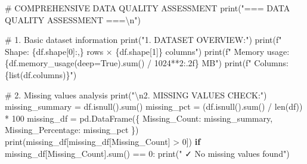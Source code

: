 \documentclass[
  letterpaper,
  DIV=11,
  numbers=noendperiod]{scrartcl}
\newenvironment{Shaded}{\begin{snugshade}}{\end{snugshade}}
\newcommand{\BuiltInTok}[1]{\textcolor[rgb]{0.00,0.23,0.31}{#1}}
\newcommand{\CharTok}[1]{\textcolor[rgb]{0.13,0.47,0.30}{#1}}
\newcommand{\CommentTok}[1]{\textcolor[rgb]{0.37,0.37,0.37}{#1}}
\newcommand{\ControlFlowTok}[1]{\textcolor[rgb]{0.00,0.23,0.31}{\textbf{#1}}}
\newcommand{\DecValTok}[1]{\textcolor[rgb]{0.68,0.00,0.00}{#1}}
\newcommand{\NormalTok}[1]{\textcolor[rgb]{0.00,0.23,0.31}{#1}}
\newcommand{\OperatorTok}[1]{\textcolor[rgb]{0.37,0.37,0.37}{#1}}
\newcommand{\SpecialCharTok}[1]{\textcolor[rgb]{0.37,0.37,0.37}{#1}}
\newcommand{\SpecialStringTok}[1]{\textcolor[rgb]{0.13,0.47,0.30}{#1}}
\newcommand{\StringTok}[1]{\textcolor[rgb]{0.13,0.47,0.30}{#1}}
\newcommand{\VariableTok}[1]{\textcolor[rgb]{0.07,0.07,0.07}{#1}}
\begin{document}
\begin{Shaded}
\begin{Highlighting}[]
\CommentTok{\# COMPREHENSIVE DATA QUALITY ASSESSMENT}
\BuiltInTok{print}\NormalTok{(}\StringTok{"=== DATA QUALITY ASSESSMENT ===}\CharTok{\textbackslash{}n}\StringTok{"}\NormalTok{)}

\CommentTok{\# 1. Basic dataset information}
\BuiltInTok{print}\NormalTok{(}\StringTok{"1. DATASET OVERVIEW:"}\NormalTok{)}
\BuiltInTok{print}\NormalTok{(}\SpecialStringTok{f"   Shape: }\SpecialCharTok{\{}\NormalTok{df}\SpecialCharTok{.}\NormalTok{shape[}\DecValTok{0}\NormalTok{]}\SpecialCharTok{:,\}}\SpecialStringTok{ rows × }\SpecialCharTok{\{}\NormalTok{df}\SpecialCharTok{.}\NormalTok{shape[}\DecValTok{1}\NormalTok{]}\SpecialCharTok{\}}\SpecialStringTok{ columns"}\NormalTok{)}
\BuiltInTok{print}\NormalTok{(}\SpecialStringTok{f"   Memory usage: }\SpecialCharTok{\{}\NormalTok{df}\SpecialCharTok{.}\NormalTok{memory\_usage(deep}\OperatorTok{=}\VariableTok{True}\NormalTok{)}\SpecialCharTok{.}\BuiltInTok{sum}\NormalTok{() }\OperatorTok{/} \DecValTok{1024}\OperatorTok{**}\DecValTok{2}\SpecialCharTok{:.2f\}}\SpecialStringTok{ MB"}\NormalTok{)}
\BuiltInTok{print}\NormalTok{(}\SpecialStringTok{f"   Columns: }\SpecialCharTok{\{}\BuiltInTok{list}\NormalTok{(df.columns)}\SpecialCharTok{\}}\SpecialStringTok{"}\NormalTok{)}

\CommentTok{\# 2. Missing values analysis}
\BuiltInTok{print}\NormalTok{(}\StringTok{"}\CharTok{\textbackslash{}n}\StringTok{2. MISSING VALUES CHECK:"}\NormalTok{)}
\NormalTok{missing\_summary }\OperatorTok{=}\NormalTok{ df.isnull().}\BuiltInTok{sum}\NormalTok{()}
\NormalTok{missing\_pct }\OperatorTok{=}\NormalTok{ (df.isnull().}\BuiltInTok{sum}\NormalTok{() }\OperatorTok{/} \BuiltInTok{len}\NormalTok{(df)) }\OperatorTok{*} \DecValTok{100}
\NormalTok{missing\_df }\OperatorTok{=}\NormalTok{ pd.DataFrame(\{}
    \StringTok{\textquotesingle{}Missing\_Count\textquotesingle{}}\NormalTok{: missing\_summary,}
    \StringTok{\textquotesingle{}Missing\_Percentage\textquotesingle{}}\NormalTok{: missing\_pct}
\NormalTok{\})}
\BuiltInTok{print}\NormalTok{(missing\_df[missing\_df[}\StringTok{\textquotesingle{}Missing\_Count\textquotesingle{}}\NormalTok{] }\OperatorTok{\textgreater{}} \DecValTok{0}\NormalTok{])}
\ControlFlowTok{if}\NormalTok{ missing\_df[}\StringTok{\textquotesingle{}Missing\_Count\textquotesingle{}}\NormalTok{].}\BuiltInTok{sum}\NormalTok{() }\OperatorTok{==} \DecValTok{0}\NormalTok{:}
    \BuiltInTok{print}\NormalTok{(}\StringTok{"   ✓ No missing values found"}\NormalTok{)}


\end{Highlighting}
\end{Shaded}
\end{document}
